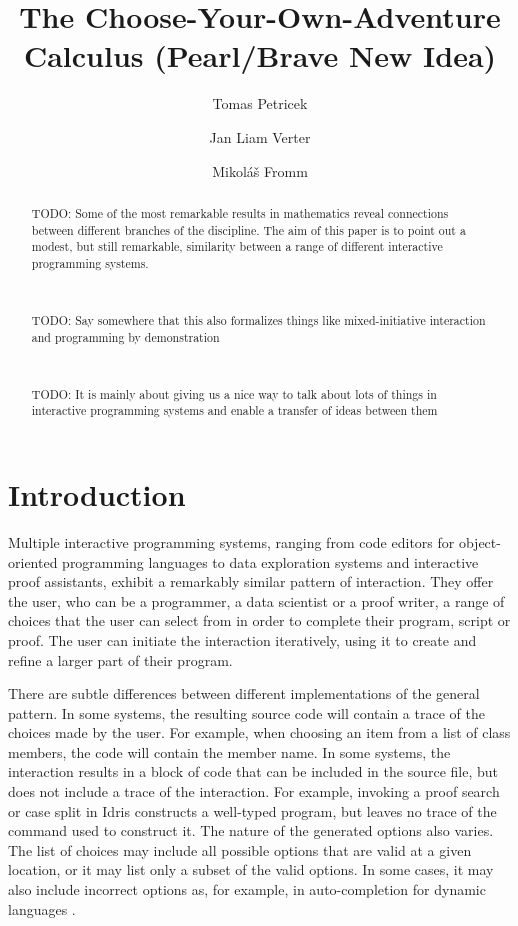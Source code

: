 \documentclass[a4paper,UKenglish,cleveref, autoref, thm-restate]{lipics-v2021}
\title{The Choose-Your-Own-Adventure Calculus (Pearl/Brave New Idea)}
\author{Tomas Petricek}{Charles University, Prague, Czechia}{tomas@tomasp.net}{0000-0002-7242-2208}{}
\author{Jan Liam Verter}{Charles University, Prague, Czechia}{todo@todo}{}{}
\author{Mikoláš Fromm}{Charles University, Prague, Czechia}{todo@todo}{}{}
\begin{document}
\maketitle

\begin{abstract}
\noindent
TODO: Some of the most remarkable results in mathematics reveal connections between different
branches of the discipline. The aim of this paper is to point out a modest, but still
remarkable, similarity between a range of different interactive programming systems.

~

\noindent
TODO: Say somewhere that this also formalizes things like mixed-initiative interaction and
programming by demonstration

~

\noindent
TODO: It is mainly about giving us a nice way to talk about lots of things in interactive
programming systems and enable a transfer of ideas between them

\end{abstract}

\newpage

\section{Introduction}

Multiple interactive programming systems, ranging from code editors for object-oriented programming
languages to data exploration systems and interactive proof assistants, exhibit a remarkably
similar pattern of interaction. They offer the user, who can be a programmer, a data scientist
or a proof writer, a range of choices that the user can select from in order to complete their
program, script or proof. The user can initiate the interaction iteratively, using it to
create and refine a larger part of their program.

There are subtle differences between different implementations of the general pattern. In some
systems, the resulting source code will contain a trace of the choices made by the user.
For example, when choosing an item from a list of class members, the code will contain the member
name. In some systems, the interaction results in a block of code that can be included in the
source file, but does not include a trace of the interaction. For example, invoking a proof search
or case split in Idris \cite{brady-2015-idris} constructs a well-typed program, but leaves no trace
of the command used to construct it.
%
The nature of the generated options also varies. The list of choices may include all possible
options that are valid at a given location, or it may list only a subset of the valid options.
In some cases, it may also include incorrect options as, for example, in auto-completion
for dynamic languages \cite{frolich-2024-autocomplete}.
\end{document}
